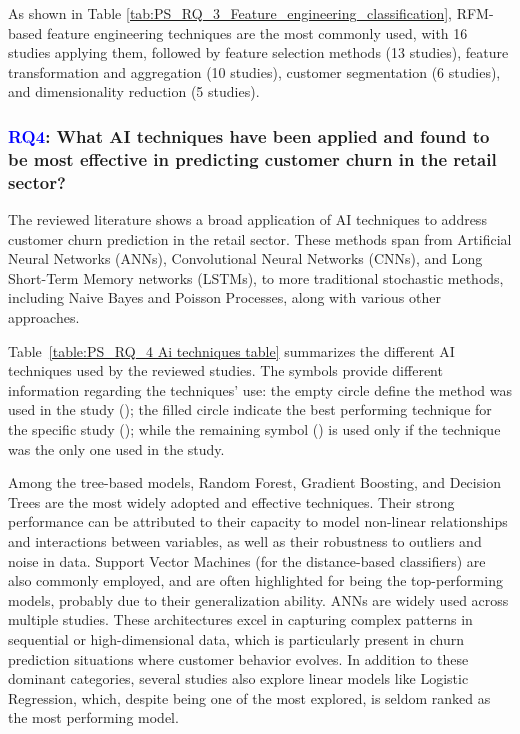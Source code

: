 \documentclass[preprint,12pt]{elsarticle}
\newcommand{\RQlabel}[1]{\textcolor{blue}{#1}}
\newcommand{\RSRQfour}{\RQlabel{RQ4}: What AI techniques have been applied and found to be most effective in predicting customer churn in the retail sector?}
\begin{document}
As shown in Table \ref{tab:PS_RQ_3_Feature_engineering_classification}, RFM-based feature engineering techniques are the most commonly used, with 16 studies applying them, followed by feature selection methods (13 studies), feature transformation and aggregation (10 studies), customer segmentation (6 studies), and dimensionality reduction  (5 studies).

\subsubsection{\RSRQfour}
\label{sec:RQ4}
The reviewed literature shows a broad application of AI techniques to address customer churn prediction in the retail sector. These methods span from Artificial Neural Networks (ANNs), Convolutional Neural Networks (CNNs), and Long Short-Term Memory networks (LSTMs), to more traditional stochastic methods, including Naive Bayes and Poisson Processes, along with various other approaches.

Table~\ref{table:PS_RQ_4 Ai techniques table} summarizes the different AI techniques used by the reviewed studies. The symbols provide different information regarding the techniques' use: the empty circle define the method was used in the study (\scalebox{0.9}{\textopenbullet}); the filled circle indicate the best performing technique for the specific study (\scalebox{0.9}{\textbullet}); while the remaining symbol (\scalebox{0.6}{$\blacksquare$}) is used only if the technique was the only one used in the study.

Among the tree-based models, Random Forest, Gradient Boosting, and Decision Trees are the most widely adopted and effective techniques. Their strong performance can be attributed to their capacity to model non-linear relationships and interactions between variables, as well as their robustness to outliers and noise in data. Support Vector Machines (for the distance-based classifiers) are also commonly employed, and are often highlighted for being the top-performing models, probably due to their generalization ability. ANNs are widely used across multiple studies. These architectures excel in capturing complex patterns in sequential or high-dimensional data, which is particularly present in churn prediction situations where customer behavior evolves. In addition to these dominant categories, several studies also explore linear models like Logistic Regression, which, despite being one of the most explored, is seldom ranked as the most performing model.
\end{document}

